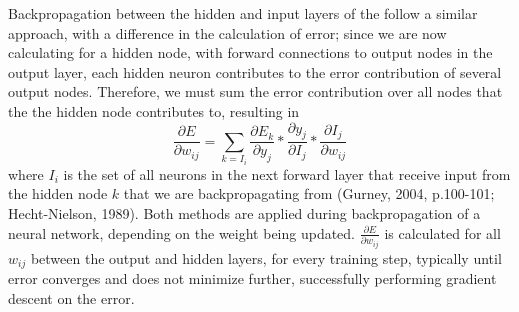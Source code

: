 \documentclass[11pt]{article}
\begin{document}
Backpropagation between the hidden and input layers of the follow a similar approach, with a difference in the calculation of error; since we are now calculating for a hidden node, with forward connections to output nodes in the output layer, each hidden neuron contributes to the error contribution of several output nodes. Therefore, we must sum the error contribution over all nodes that the the hidden node contributes to, resulting in $$\frac{\partial E}{\partial w_{ij}} = \sum_{k=I_i}{\frac{\partial E_k}{\partial y_j}} * \frac{\partial y_j}{\partial I_{j}} * \frac{\partial I_{j}}{\partial w_{ij}}$$ where $I_i$ is the set of all neurons in the next forward layer that receive input from the hidden node $k$ that we are backpropagating from (Gurney, 2004, p.100-101; Hecht-Nielson, 1989). Both methods are applied during backpropagation of a neural network, depending on the weight being updated. $\frac{\partial E}{\partial w_{ij}}$ is calculated for all $w_{ij}$ between the output and hidden layers, for every training step, typically until error converges and does not minimize further, successfully performing gradient descent on the error.\par
\end{document}
